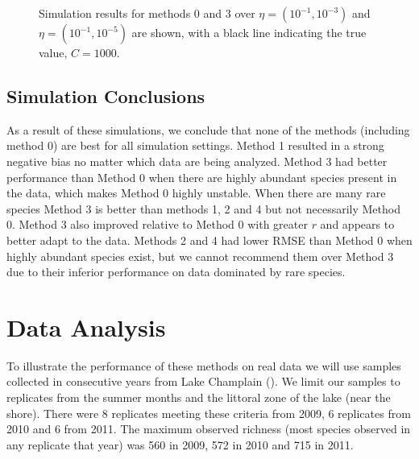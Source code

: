 \documentclass[oupdraft]{bio}
\begin{document}
\begin{figure}[t]
\caption{Simulation results for methods 0 and 3 over $\eta = (10^{-1}, 10^{-3})$ and $\eta = (10^{-1}, 10^{-5})$ are shown, with a black line indicating the true value, $C = 1000$.
\label{fig:tuning_sim_2}}
\centering{}
\end{figure}

\subsection{Simulation Conclusions}

As a result of these simulations, we conclude that none of the methods (including method 0) are best for all simulation settings.  Method 1 resulted in a strong negative bias no matter which data are being analyzed.  Method 3 had better performance than Method 0 when there are highly abundant species present in the data, which makes Method 0 highly unstable.  When there are many rare species Method 3 is better than methods 1, 2 and 4 but not necessarily Method 0.  Method 3 also improved relative to Method 0 with greater $r$ and appears to better adapt to the data.  Methods 2 and 4 had lower RMSE than Method 0 when highly abundant species exist, but we cannot recommend them over Method 3 due to their inferior performance on data dominated by rare species.

\section{Data Analysis}
\label{sec:data_analysis}

To illustrate the performance of these methods on real data we will use samples collected in consecutive years from Lake Champlain (\citet{tromas_2017}).  We limit our samples to replicates from the summer months and the littoral zone of the lake  (near the shore).  There were 8 replicates meeting these criteria from 2009, 6 replicates from 2010 and 6 from 2011.  The maximum observed richness (most species observed in any replicate that year) was 560 in 2009, 572 in 2010 and 715 in 2011.
\end{document}
